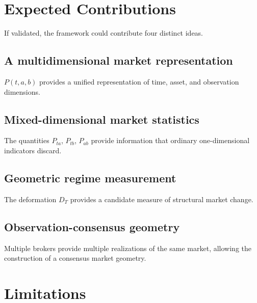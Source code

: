 \documentclass[11pt,a4paper]{article}
\numberwithin{equation}{section}
\begin{document}
\section{Expected Contributions}

If validated, the framework could contribute four distinct ideas.

\subsection{A multidimensional market representation}
$P(t,a,b)$ provides a unified representation of time, asset, and
observation dimensions.

\subsection{Mixed-dimensional market statistics}
The quantities $P_{ta}$, $P_{tb}$, $P_{ab}$ provide information that
ordinary one-dimensional indicators discard.

\subsection{Geometric regime measurement}
The deformation $D_T$ provides a candidate measure of structural
market change.

\subsection{Observation-consensus geometry}
Multiple brokers provide multiple realizations of the same market,
allowing the construction of a consensus market geometry.

\section{Limitations}
\end{document}
